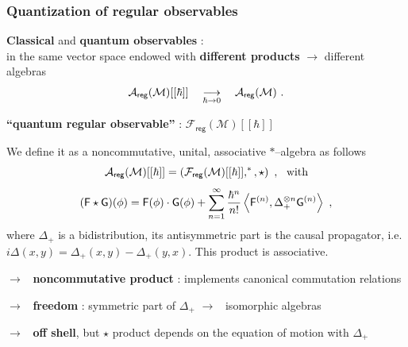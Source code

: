 \documentclass[9pt]{beamer}
\newcommand{\sm}[1]{\left\langle #1 \right\rangle}
\newcommand{\reg}{\mathsf{reg}}
\newcommand{\Acal}{\mathcal{A}}
\newcommand{\Fcal}{\mathcal{F}}
\newcommand{\Mcal}{\mathcal{M}}
\newcommand{\Fsf}{\mathsf{F}}
\newcommand{\Gsf}{\mathsf{G}}
\begin{document}

\begin{frame}

\frametitle{Quantization of regular observables}

\vfill

\textbf{Classical} and \textbf{quantum observables} : \\
in the same vector space endowed with \textbf{different products} $\to$ different algebras
%
\vspace*{-10pt}
\begin{equation*}
\Acal_\reg(\Mcal)[[\hbar]] \quad \underset{\hbar \to 0}{\longrightarrow} \quad \Acal_\reg(\Mcal) \ . 
\vspace*{-8pt}%
\end{equation*}

\vfill

\textbf{``quantum regular observable''} : $\Fcal_\reg(\Mcal)[[\hbar]]$ 

\vfill

\begin{definition}
\vspace*{-8pt}
We define it as a noncommutative, unital, associative $\ast$--algebra as follows
%
\vspace*{-10pt}
\begin{equation*}
\Acal_\reg(\Mcal)[[\hbar]] = \left(\Fcal_\reg(\Mcal)[[\hbar]] , ^\ast , \star \right) \ , \ \ \mbox{with}
\vspace*{-8pt}
\end{equation*}
%
\begin{equation*}
(\Fsf \star \Gsf)(\phi) = \Fsf(\phi) \cdot \Gsf(\phi) + \sum_{n=1}^\infty \frac{\hbar^n}{n!} \sm{ \Fsf^{(n)} , \Delta_+^{\otimes n} \Gsf^{(n) } } \ ,
\vspace*{-5pt}%
\end{equation*}
%
where $\Delta_+$ is a bidistribution, its antisymmetric part is the causal propagator, i.e. $i \Delta(x,y) = \Delta_+(x,y) - \Delta_+(y,x)$. This product is associative. 
\end{definition}

\vfill

$\to$ \ \textbf{noncommutative product} : implements canonical commutation relations

$\to$ \ \textbf{freedom} : symmetric part of $\Delta_+$ $\to$ \ isomorphic algebras

$\to$ \ \textbf{off shell}, but $\star$ product depends on the equation of motion with $\Delta_+$

\vfill

\end{frame}  
\end{document}
